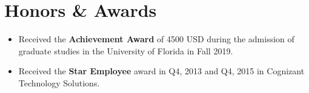 \documentclass[11pt,letter,sans]{moderncv}
\begin{document}
\section{ Honors \& Awards }
\begin{itemize}
    \item{Received the \textbf{Achievement Award} of 4500 USD during the admission of graduate studies in the University of Florida in Fall 2019.}
    \item {Received the \textbf{Star Employee} award in Q4, 2013 and Q4, 2015 in Cognizant Technology Solutions.}
\end{itemize}
    



  
    
  
    
  
    
    
  
    
    
\end{document}
